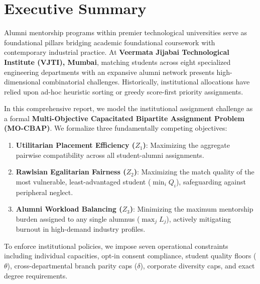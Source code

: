 \documentclass[11pt,a4paper,oneside]{report}
\begin{document}
\tableofcontents
\newpage
\listoffigures
\newpage
\listoftables
\newpage

\chapter*{Executive Summary}

Alumni mentorship programs within premier technological universities serve as foundational pillars bridging academic foundational coursework with contemporary industrial practice. At \textbf{Veermata Jijabai Technological Institute (VJTI), Mumbai}, matching students across eight specialized engineering departments with an expansive alumni network presents high-dimensional combinatorial challenges. Historically, institutional allocations have relied upon ad-hoc heuristic sorting or greedy score-first priority assignments. 

In this comprehensive report, we model the institutional assignment challenge as a formal \textbf{Multi-Objective Capacitated Bipartite Assignment Problem (MO-CBAP)}. We formalize three fundamentally competing objectives:
\begin{enumerate}
    \item \textbf{Utilitarian Placement Efficiency ($Z_1$)}: Maximizing the aggregate pairwise compatibility across all student-alumni assignments.
    \item \textbf{Rawlsian Egalitarian Fairness ($Z_2$)}: Maximizing the match quality of the most vulnerable, least-advantaged student ($\min_i Q_i$), safeguarding against peripheral neglect.
    \item \textbf{Alumni Workload Balancing ($Z_3$)}: Minimizing the maximum mentorship burden assigned to any single alumnus ($\max_j L_j$), actively mitigating burnout in high-demand industry profiles.
\end{enumerate}

To enforce institutional policies, we impose seven operational constraints including individual capacities, opt-in consent compliance, student quality floors ($\theta$), cross-departmental branch parity caps ($\delta$), corporate diversity caps, and exact degree requirements.
\end{document}
